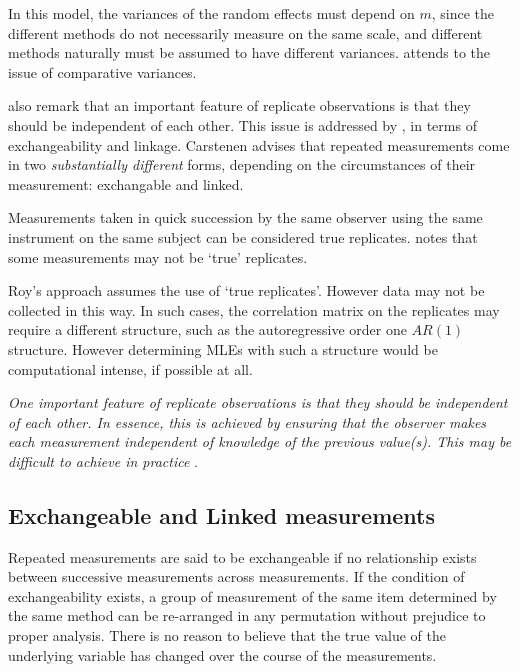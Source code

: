 \documentclass[12pt, a4paper]{report}
\theoremstyle{plain}
\theoremstyle{definition}
\theoremstyle{remark}
\begin{document}
	
	
	
	In this model, the variances of the random effects must depend on
	$m$, since the different methods do not necessarily measure on the 	same scale, and different methods naturally must be assumed to have different variances. \citet{BXC2004} attends to the issue of comparative variances.
	
	
	\citet{BA99} also remark that an important feature of replicate observations is that they should be independent
	of each other. This issue is addressed by \citet{BXC2010}, in terms of exchangeability and linkage. Carstenen advises that repeated measurements come in two \emph{substantially different} forms, depending on the circumstances of their measurement: exchangable and linked.
	
	
	Measurements taken in quick succession by the same observer using the same instrument on the same subject can be considered true replicates. \citet{ARoy2009} notes that some measurements may not be `true' replicates.
	
	Roy's approach assumes the use of `true replicates'. However data may not be collected in this way. In such cases, the correlation matrix on the replicates may require a different structure, such as the autoregressive order one $AR(1)$ structure. However determining MLEs with such a structure would be computational intense, if possible at all.
	
	\emph{
		One important feature of replicate observations is that they should be independent
		of each other. In essence, this is achieved by ensuring that the observer makes each
		measurement independent of knowledge of the previous value(s). This may be difficult
		to achieve in practice} \citep{BA99}.

	\subsection{Exchangeable and Linked measurements}
	
	
	Repeated measurements are said to be exchangeable if no relationship exists between successive measurements across measurements. If the condition of exchangeability exists, a group of measurement of the same item determined by the same method can be re-arranged in any permutation without prejudice to proper analysis. There is no reason to believe that the true value of the underlying variable has changed over the course of the measurements.
	
\end{document}
